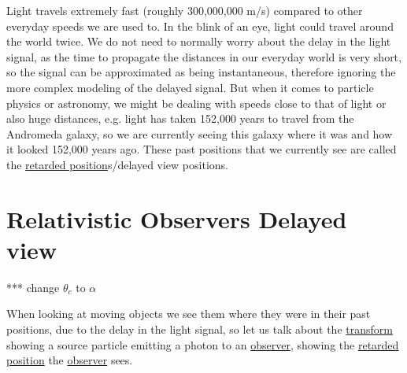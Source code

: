 Light travels extremely fast (roughly 300,000,000 m/s) compared to other everyday speeds we are used to.
In the blink of an eye, light could travel around the world twice.
We do not need to normally worry about the delay in the light signal, as the time to propagate the distances in our everyday world is very short, so the signal can be approximated as being instantaneous, therefore ignoring the more complex modeling of the delayed signal.
But when it comes to particle physics or astronomy, we might be dealing with speeds close to that of light or also huge distances, e.g.
light has taken 152,000 years to travel from the Andromeda galaxy, so we are currently seeing this galaxy where it was and how it looked 152,000 years ago.
These past positions that we currently see are called the \hyperlink{def-retarded-position}{retarded position}s/delayed view positions.

\section{Relativistic Observers Delayed view}

*** change $\theta_c$ to $\alpha$

When looking at moving objects we see them where they were in their past positions, due to the delay in the light signal, so let us talk about the \hyperlink{def-transform}{transform} showing a source particle emitting a photon to an \hyperlink{def-observer}{observer}, showing the \hyperlink{def-retarded-position}{retarded position} the \hyperlink{def-observer}{observer} sees.

